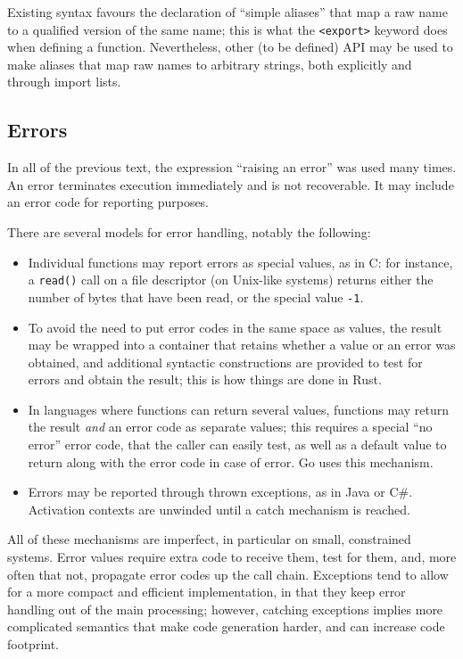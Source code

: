 Existing syntax favours the declaration of ``simple aliases'' that map a
raw name to a qualified version of the same name; this is what the
\verb|<export>| keyword does when defining a function. Nevertheless,
other (to be defined) API may be used to make aliases that map raw names
to arbitrary strings, both explicitly and through import lists.

\subsection{Errors}

In all of the previous text, the expression ``raising an error'' was used
many times. An error terminates execution immediately and is not
recoverable. It may include an error code for reporting purposes.

\begin{rationale}
There are several models for error handling, notably the following:
\begin{itemize}

    \item Individual functions may report errors as special values, as
    in C: for instance, a \verb|read()| call on a file descriptor (on
    Unix-like systems) returns either the number of bytes that have been
    read, or the special value \verb|-1|.

    \item To avoid the need to put error codes in the same space as
    values, the result may be wrapped into a container that retains
    whether a value or an error was obtained, and additional syntactic
    constructions are provided to test for errors and obtain the
    result; this is how things are done in Rust.

    \item In languages where functions can return several values,
    functions may return the result \emph{and} an error code as separate
    values; this requires a special ``no error'' error code, that the
    caller can easily test, as well as a default value to return along
    with the error code in case of error. Go uses this mechanism.

    \item Errors may be reported through thrown exceptions, as in Java
    or C\#. Activation contexts are unwinded until a catch mechanism
    is reached.

\end{itemize}

All of these mechanisms are imperfect, in particular on small,
constrained systems. Error values require extra code to receive them,
test for them, and, more often that not, propagate error codes up the
call chain. Exceptions tend to allow for a more compact and efficient
implementation, in that they keep error handling out of the main
processing; however, catching exceptions implies more complicated
semantics that make code generation harder, and can increase code
footprint.


\end{rationale}
